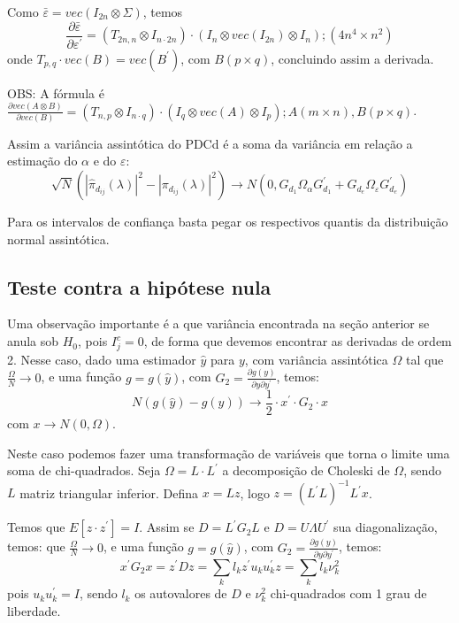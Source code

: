 \documentclass[a4paper,10pt]{article}
\begin{document}
Como $\bar{\varepsilon} = vec(I_{2n} \otimes \Sigma)$, temos
\begin{equation}
\frac{\partial \bar{\varepsilon}}{\partial \varepsilon^{'}} = (T_{2n,n} \otimes I_{n \cdot 2n}) \cdot (I_{n} \otimes vec(I_{2n}) \otimes I_{n}); (4n^{4} \times n^{2})
\end{equation}
onde $T_{p,q} \cdot vec(B) = vec(B^{'})$, com $B (p \times q)$, concluindo assim a derivada.

OBS: A fórmula é $\frac{\partial vec(A \otimes B)}{\partial vec(B)} = (T_{n,p} \otimes I_{n \cdot q}) \cdot (I_{q} \otimes vec(A) \otimes I_{p}); A (m \times n), B (p \times q)$.

Assim a variância assintótica do PDCd é a soma da variância em relação a estimação do $\alpha$ e do $\varepsilon$:
\begin{equation}
\sqrt{N} (|\hat{\pi}_{d_{ij}}(\lambda)|^{2} - |\pi_{d_{ij}}(\lambda)|^{2}) \to N(0, G_{d_1} \Omega_{\alpha} G_{d_1}^{'} + G_{d_e} \Omega_{\varepsilon} G_{d_e}^{'}) 
\end{equation}

Para os intervalos de confiança basta pegar os respectivos quantis da distribuição normal assintótica.

\subsection{Teste contra a hipótese nula}

Uma observação importante é a que variância encontrada na seção anterior se anula sob $H_0$, pois $I_{j}^{c} = 0$, de forma que devemos encontrar as derivadas de ordem 2. Nesse caso, dado uma estimador $\hat{y}$ para $y$, com variância assintótica $\Omega$ tal que $\frac{\Omega}{N} \to 0$, e uma função $g = g(\hat{y})$, com $G_2 = \frac{\partial g(y)}{\partial y \partial y^{'}}$, temos:
\begin{equation}
N (g(\hat{y}) - g(y)) \to \frac{1}{2} \cdot x^{'} \cdot G_2 \cdot x
\end{equation}
com $x \to N(0, \Omega)$.

Neste caso podemos fazer uma transformação de variáveis que torna o limite uma soma de chi-quadrados. Seja $\Omega = L \cdot L^{'}$ a decomposição de Choleski de $\Omega$, sendo $L$ matriz triangular inferior. Defina $x = Lz$, logo $z = (L^{'}L)^{-1} L^{'} x$.

Temos que $E[z \cdot z^{'}] = I$. Assim se $D = L^{'} G_2 L$ e $D = U \Lambda U^{'}$ sua diagonalização, temos:
que $\frac{\Omega}{N} \to 0$, e uma função $g = g(\hat{y})$, com $G_2 = \frac{\partial g(y)}{\partial y \partial y^{'}}$, temos:
\begin{equation}
x^{'} G_{2} x = z^{'} D z = \sum_{k} {l_{k} z^{'} u_{k} u_{k}^{'} z} = \sum_{k} {l_{k} \nu_{k}^{2}}
\end{equation}
pois $u_{k} u_{k}^{'} = I$, sendo $l_{k}$ os autovalores de $D$ e $\nu_{k}^{2}$ chi-quadrados com 1 grau de liberdade.
\end{document}
